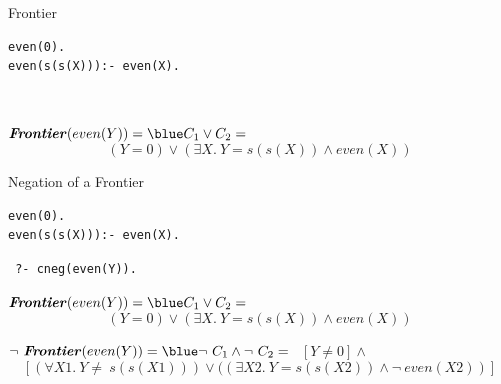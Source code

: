 \documentclass[pdf,slideColor,contemporain]{prosper}
\begin{document}
\begin{slide}{Frontier}
\begin{small}
\begin{minipage}{2.5in}
{\blue
 \begin{verbatim}
even(0).
even(s(s(X))):- even(X).

 \end{verbatim}
}
\end{minipage} 
\begin{minipage}{1.5in}
{\blue
 \begin{verbatim}


 \end{verbatim}
}
\end{minipage}
\end{small}

\begin{small}
$\mbox{\bf\emph{Frontier}}(even(Y)) = {\blue C_1 \vee C_2} = $ 
\[ ( Y=0 ) \vee ( \exists X.~ Y=s(s(X)) \wedge even(X) )  \] 


\end{small}

\end{slide}
\begin{slide}{Negation of a Frontier}
\begin{small}
\begin{minipage}{2.5in}
{\blue
 \begin{verbatim}
even(0).
even(s(s(X))):- even(X).

 \end{verbatim}
}
\end{minipage} 
\begin{minipage}{1.5in}
{\blue
 \begin{verbatim}
 ?- cneg(even(Y)).

 \end{verbatim}
}
\end{minipage}
\end{small}

\begin{small}
$\mbox{\bf\emph{Frontier}}(even(Y)) = {\blue C_1 \vee C_2} = $ 
\[ ( Y=0 ) \vee ( \exists X.~ Y=s(s(X)) \wedge even(X) )  \] 

$\neg ~\mbox{\bf \emph{Frontier}}(even(Y)) = {\blue \neg~ C_1 \wedge
\neg~ C_2} = $ $ ~~ [ Y \neq 0 ] \wedge $\[\left[ (\forall X1.~ Y
\neq ~s(s(X1))) \vee ( (\exists X2.~ Y=s(s(X2)) \wedge \neg~ even(X2)
)\right] \]
\end{small}

\end{slide}
\end{document}
